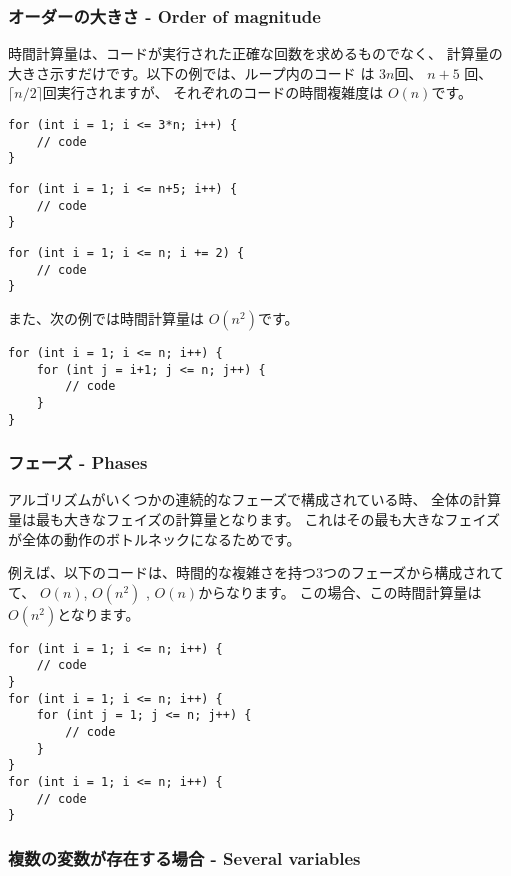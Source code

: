 \subsubsection*{オーダーの大きさ - Order of magnitude}

時間計算量は、コードが実行された正確な回数を求めるものでなく、
計算量の大きさ示すだけです。以下の例では、ループ内のコード は $3n$回、
$n+5$ 回、$\lceil n/2 \rceil$回実行されますが、
それぞれのコードの時間複雑度は $O(n)$です。

\begin{lstlisting}
for (int i = 1; i <= 3*n; i++) {
    // code
}
\end{lstlisting}

\begin{lstlisting}
for (int i = 1; i <= n+5; i++) {
    // code
}
\end{lstlisting}

\begin{lstlisting}
for (int i = 1; i <= n; i += 2) {
    // code
}
\end{lstlisting}

また、次の例では時間計算量は $O(n^2)$です。

\begin{lstlisting}
for (int i = 1; i <= n; i++) {
    for (int j = i+1; j <= n; j++) {
        // code
    }
}
\end{lstlisting}

\subsubsection*{フェーズ - Phases}

アルゴリズムがいくつかの連続的なフェーズで構成されている時、
全体の計算量は最も大きなフェイズの計算量となります。
これはその最も大きなフェイズが全体の動作のボトルネックになるためです。

例えば、以下のコードは、時間的な複雑さを持つ3つのフェーズから構成されてて、
$O(n)$, $O(n^2)$ , $O(n)$からなります。
この場合、この時間計算量は$O(n^2)$となります。

\begin{lstlisting}
for (int i = 1; i <= n; i++) {
    // code
}
for (int i = 1; i <= n; i++) {
    for (int j = 1; j <= n; j++) {
        // code
    }
}
for (int i = 1; i <= n; i++) {
    // code
}
\end{lstlisting}

\subsubsection*{複数の変数が存在する場合 - Several variables}

